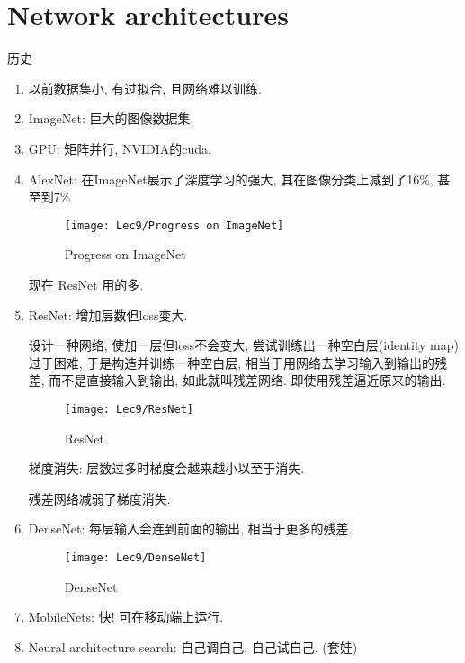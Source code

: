 \section{Network architectures}
历史
\begin{enumerate}
    \item 以前数据集小, 有过拟合, 且网络难以训练. 
    \item ImageNet: 巨大的图像数据集. 
    \item GPU: 矩阵并行, NVIDIA的cuda. 
    \item AlexNet: 在ImageNet展示了深度学习的强大, 其在图像分类上减到了16\%, 甚至到7\%
    \begin{figure}[H]
        \centering
        \texttt{[image: Lec9/Progress on ImageNet]}
        \caption{Progress on ImageNet}
    \end{figure}
    
    现在 ResNet 用的多. 
    \item ResNet: 增加层数但loss变大. 
    
    设计一种网络, 使加一层但loss不会变大, 尝试训练出一种空白层(identity map)过于困难, 于是构造并训练一种空白层, 相当于用网络去学习输入到输出的残差, 而不是直接输入到输出, 如此就叫残差网络. 即使用残差逼近原来的输出. 
    
    \begin{figure}[H]
        \centering
        \texttt{[image: Lec9/ResNet]}
        \caption{ResNet}
    \end{figure}
    
    梯度消失: 层数过多时梯度会越来越小以至于消失. 

    残差网络减弱了梯度消失. 

    \item DenseNet: 每层输入会连到前面的输出, 相当于更多的残差. 
    \begin{figure}[H]
        \centering
        \texttt{[image: Lec9/DenseNet]}
        \caption{DenseNet}
    \end{figure}
    
    \item MobileNets: 快! 可在移动端上运行. 
    \item Neural architecture search: 自己调自己, 自己试自己. (套娃)
\end{enumerate}
